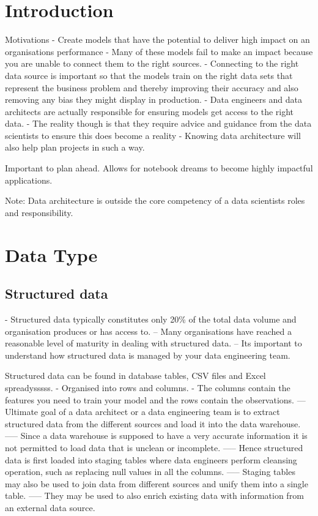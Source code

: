 \documentclass[11pt]{article}
\begin{document}
    \section{Introduction}
    Motivations
    - Create models that have the potential to deliver high impact on an organisations performance
    - Many of these models fail to make an impact because you are unable to connect them to the right sources.
    - Connecting to the right data source is important so that the models train on the right data sets that represent the business problem and thereby improving their accuracy and also removing any bias they might display in production.
    - Data engineers and data architects are actually responsible for ensuring models get access to the right data.
    - The reality though is that they require advice and guidance from the data scientists to ensure this does become a reality
    - Knowing data architecture will also help plan projects in such a way.

    Important to plan ahead.
    Allows for notebook dreams to become highly impactful applications.

    Note: Data architecture is outside the core competency of a data scientists roles and responsibility.


    \section{Data Type}

    \subsection{Structured data}
    - Structured data typically constitutes only 20\% of the total data volume and organisation produces or has access to.
    -- Many organisations have reached a reasonable level of maturity in dealing with structured data.
    -- Its important to understand how structured data is managed by your data engineering team.

    Structured data can be found in database tables, CSV files and Excel spreadysssss.
    - Organised into rows and columns.
    - The columns contain the features you need to train your model and the rows contain the observations.
    --- Ultimate goal of a data architect or a data engineering team is to extract structured data from the different sources and load it into the data warehouse.
    ----- Since a data warehouse is supposed to have a very accurate information it is not permitted to load data that is unclean or incomplete.
    ----- Hence structured data is first loaded into staging tables where data engineers perform cleansing operation, such as replacing null values in all the columns.
    ----- Staging tables may also be used to join data from different sources and unify them into a single table.
    ----- They may be used to also enrich existing data with information from an external data source.
\end{document}
